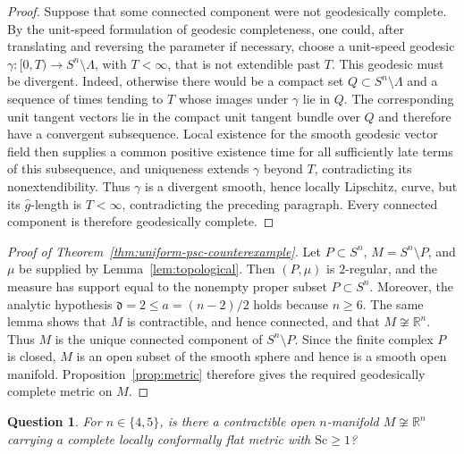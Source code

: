 \documentclass[12pt,oneside,a4paper]{article}
\theoremstyle{mytheorem}
\newtheorem{question}[definition]{Question}
\theoremstyle{remark}
\theoremstyle{definition}
\begin{document}
\begin{proof}
Suppose that some connected component were not geodesically complete.
By the unit-speed formulation of geodesic completeness, one could, after translating
and reversing the parameter if necessary, choose a unit-speed geodesic
$\gamma:[0,T)\to S^n\setminus\Lambda$, with $T<\infty$, that is not
extendible past $T$.  This geodesic must be divergent.  Indeed, otherwise
there would be a compact set $Q\subset S^n\setminus\Lambda$ and a
sequence of times tending to $T$ whose images under $\gamma$ lie in $Q$.
The corresponding unit tangent vectors lie in the compact unit tangent
bundle over $Q$ and therefore have a convergent subsequence.
Local existence for the smooth geodesic vector field then supplies a
common positive existence time for all sufficiently late terms of this
subsequence, and
uniqueness extends $\gamma$ beyond $T$, contradicting its
nonextendibility.
Thus $\gamma$ is a divergent smooth, hence locally Lipschitz, curve, but
its $\widehat g$-length is $T<\infty$, contradicting the preceding
paragraph.  Every connected component is therefore geodesically
complete.
\end{proof}

\begin{proof}[Proof of Theorem~\ref{thm:uniform-psc-counterexample}]
Let $P\subset S^n$, $M=S^n\setminus P$, and $\mu$ be supplied by
Lemma~\ref{lem:topological}.  Then $(P,\mu)$ is $2$-regular, and
the measure has support equal to the nonempty proper subset \(P\subset S^n\).  Moreover,
the analytic hypothesis $\mathfrak d=2\le a=(n-2)/2$ holds because
$n\geq 6$.  The same lemma shows that $M$ is
contractible, and hence connected, and that
$M\not\cong\mathbb R^n$.  Thus $M$ is the unique connected component
of $S^n\setminus P$.  Since the finite complex $P$ is closed, $M$ is an
open subset of the smooth sphere and hence is a smooth open manifold.
Proposition~\ref{prop:metric} therefore gives
the required geodesically complete metric on $M$.
\end{proof}




\begin{question}\label{q:lowdim}
For $n\in\{4,5\}$, is there a contractible open $n$-manifold
$M\not\cong\mathbb R^n$ carrying a complete locally conformally flat
metric with $\mathrm{Sc}\ge1$?
\end{question}
\end{document}
